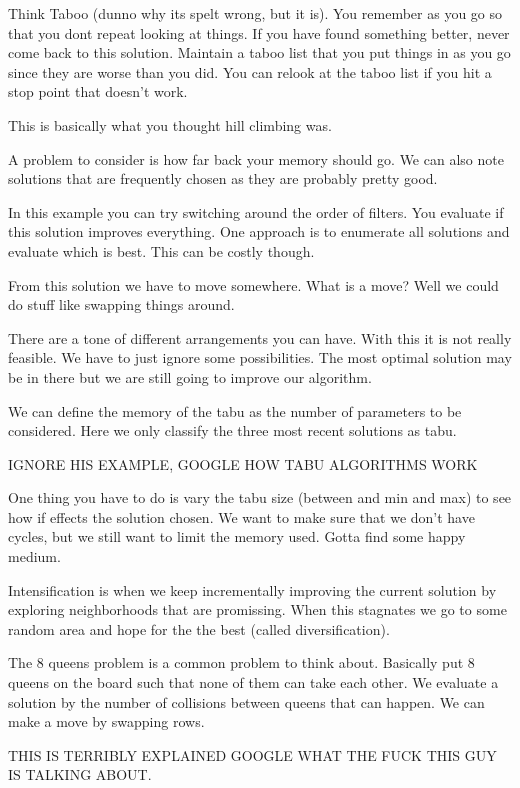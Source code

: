 \documentclass[12pt]{article}
\begin{document}
 
Think Taboo (dunno why its spelt wrong, but it is). You remember as you go so that you dont repeat looking at things. If you have found something better, never come back to this solution. Maintain a taboo list that you put things in as you go since they are worse than you did. You can relook at the taboo list if you hit a stop point that doesn't work.

 
This is basically what you thought hill climbing was.

 
A problem to consider is how far back your memory should go. We can also note solutions that are frequently chosen as they are probably pretty good.

 
In this example you can try switching around the order of filters. You evaluate if this solution improves everything. One approach is to enumerate all solutions and evaluate which is best. This can be costly though. 

 
From this solution we have to move somewhere. What is a move? Well we could do stuff like swapping things around. 

 
There are a tone of different arrangements you can have. With this it is not really feasible. We have to just ignore some possibilities. The most optimal solution may be in there but we are still going to improve our algorithm.

 
We can define the memory of the tabu as the number of parameters to be considered. Here we only classify the three most recent solutions as tabu.


IGNORE HIS EXAMPLE, GOOGLE HOW TABU ALGORITHMS WORK

 
One thing you have to do is vary the tabu size (between and min and max) to see how if effects the solution chosen. We want to make sure that we don't have cycles, but we still want to limit the memory used. Gotta find some happy medium.

 
Intensification is when we keep incrementally improving the current solution by exploring neighborhoods that are promissing. When this stagnates we go to some random area and hope for the the best (called diversification).

 
The 8 queens problem is a common problem to think about. Basically put 8 queens on the board such that none of them can take each other. We evaluate a solution by the number of collisions between queens that can happen. We can make a move by swapping rows.

 
THIS IS TERRIBLY EXPLAINED GOOGLE WHAT THE FUCK THIS GUY IS TALKING ABOUT.  
\end{document}
